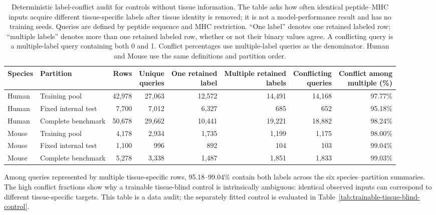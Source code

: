 \begin{table}[t]
\centering
\caption{Deterministic label-conflict audit for controls without tissue information. The table asks how often identical peptide--MHC inputs acquire different tissue-specific labels after tissue identity is removed; it is not a model-performance result and has no training seeds. Queries are defined by peptide sequence and MHC restriction. ``One label'' denotes one retained labeled row; ``multiple labels'' denotes more than one retained labeled row, whether or not their binary values agree. A conflicting query is a multiple-label query containing both 0 and 1. Conflict percentages use multiple-label queries as the denominator. Human and Mouse use the same definitions and partition order.}
\label{tab:tissue-blind-conflict-audit}
\fontsize{7.2}{8.2}\selectfont
\setlength{\tabcolsep}{2.5pt}
\begin{tabularx}{\textwidth}{@{}l>{\raggedright\arraybackslash}Xrrrrrr@{}}
\toprule
Species & Partition & Rows & \shortstack{Unique\\queries} & \shortstack{One retained\\label} & \shortstack{Multiple retained\\labels} & \shortstack{Conflicting\\queries} & \shortstack{Conflict among\\multiple (\%)} \\
\midrule
Human & Training pool & 42,978 & 27,063 & 12,572 & 14,491 & 14,168 & 97.77\% \\
Human & Fixed internal test & 7,700 & 7,012 & 6,327 & 685 & 652 & 95.18\% \\
Human & Complete benchmark & 50,678 & 29,662 & 10,441 & 19,221 & 18,882 & 98.24\% \\
\midrule
Mouse & Training pool & 4,178 & 2,934 & 1,735 & 1,199 & 1,175 & 98.00\% \\
Mouse & Fixed internal test & 1,100 & 996 & 892 & 104 & 103 & 99.04\% \\
Mouse & Complete benchmark & 5,278 & 3,338 & 1,487 & 1,851 & 1,833 & 99.03\% \\
\bottomrule
\end{tabularx}
\end{table}

Among queries represented by multiple tissue-specific rows, 95.18--99.04\% contain both labels across the six species--partition summaries. The high conflict fractions show why a trainable tissue-blind control is intrinsically ambiguous: identical observed inputs can correspond to different tissue-specific targets. This table is a data audit; the separately fitted control is evaluated in Table~\ref{tab:trainable-tissue-blind-control}.

